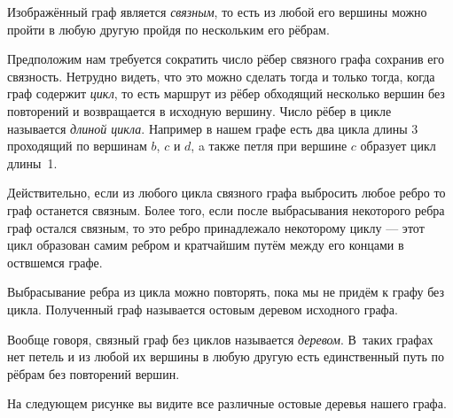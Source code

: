 \documentclass{article}
\begin{document}
Изображённый граф является \emph{связным}, то есть из любой его вершины можно пройти в любую другую пройдя по нескольким его рёбрам.

Предположим нам требуется сократить число рёбер связного графа сохранив его связность.
Нетрудно видеть, что это можно сделать тогда и только тогда, когда граф содержит \emph{цикл},
то есть маршрут из рёбер обходящий несколько вершин без повторений и возвращается в исходную вершину. 
Число рёбер в цикле называется \emph{длиной цикла}.
Например в нашем графе есть два цикла  длины 3 проходящий по вершинам $b$, $c$ и $d$, 
a также петля при вершине $c$ образует цикл длины~1.

Действительно, если из любого цикла связного графа выбросить любое ребро то граф останется связным.
Более того, если после выбрасывания некоторого ребра граф остался связным, то это ребро принадлежало некоторому циклу --- этот цикл образован самим ребром и кратчайшим путём между его концами в оствшемся графе.

Выбрасывание ребра из цикла можно повторять, пока мы не придём к графу без цикла.
Полученный граф называется остовым деревом исходного графа.

Вообще говоря, связный граф без циклов называется \emph{деревом}.
В~таких графах нет петель и из любой их вершины в любую другую есть единственный путь по рёбрам без повторений вершин.

На следующем рисунке вы видите все различные остовые деревья нашего графа.
\end{document}
